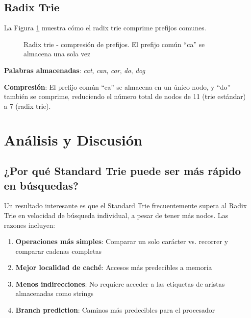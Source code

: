 \documentclass[11pt,a4paper]{article}
\begin{document}
\subsection{Radix Trie}

La Figura \ref{fig:radix_trie} muestra cómo el radix trie comprime prefijos comunes.

\begin{figure}[H]
\centering
{}
\caption{Radix trie - compresión de prefijos. El prefijo común ``ca'' se almacena una sola vez}
\label{fig:radix_trie}
\end{figure}

\textbf{Palabras almacenadas}: \textit{cat}, \textit{can}, \textit{car}, \textit{do}, \textit{dog}

\textbf{Compresión}: El prefijo común ``ca'' se almacena en un único nodo, y ``do'' también se comprime, reduciendo el número total de nodos de 11 (trie estándar) a 7 (radix trie).

\section{Análisis y Discusión}

\subsection{¿Por qué Standard Trie puede ser más rápido en búsquedas?}

Un resultado interesante es que el Standard Trie frecuentemente supera al Radix Trie en velocidad de búsqueda individual, a pesar de tener más nodos. Las razones incluyen:

\begin{enumerate}
    \item \textbf{Operaciones más simples}: Comparar un solo carácter vs. recorrer y comparar cadenas completas
    \item \textbf{Mejor localidad de caché}: Accesos más predecibles a memoria
    \item \textbf{Menos indirecciones}: No requiere acceder a las etiquetas de aristas almacenadas como strings
    \item \textbf{Branch prediction}: Caminos más predecibles para el procesador
\end{enumerate}
\end{document}
